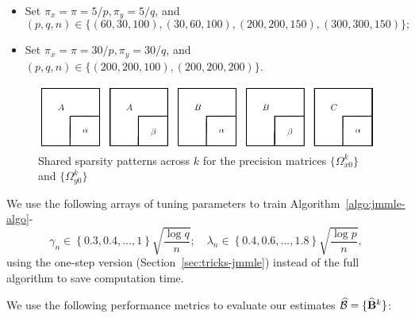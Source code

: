 \begin{itemize}
\item Set $\pi_x = \pi = 5/p, \pi_y = 5/q$, and
%
$$
(p,q,n) \in \{ (60,30,100), (30,60,100), (200,200,150), (300,300,150) \};
$$

\item Set $\pi_x = \pi = 30/p, \pi_y = 30/q$, and $(p,q,n) \in  \{ (200,200,100), (200,200,200) \}$.
\end{itemize}
%

\begin{figure}
\centering
\includegraphics{omega-structure}
\caption{Shared sparsity patterns across $k$ for the precision matrices $\{ \Omega_{x0}^k\}$ and $\{ \Omega_{y0}^k\}$}
\label{fig:sim-structure}
\end{figure}

We use the following arrays of tuning parameters to train Algorithm~\ref{algo:jmmle-algo}-
%
$$
\gamma_n \in \left\{ 0.3, 0.4, ..., 1 \right\} \sqrt{\frac{\log q}{n}}; \quad
\lambda_n \in \left\{ 0.4, 0.6, ..., 1.8 \right\} \sqrt{\frac{\log p}{n}},
$$
%
using the one-step version (Section~\ref{sec:tricks-jmmle}) instead of the full algorithm to save computation time.

We use the following performance metrics to evaluate our estimates $\widehat {{\cal{B}}} = \{ \widehat {{\mathbf{B}}}^k \}$:

